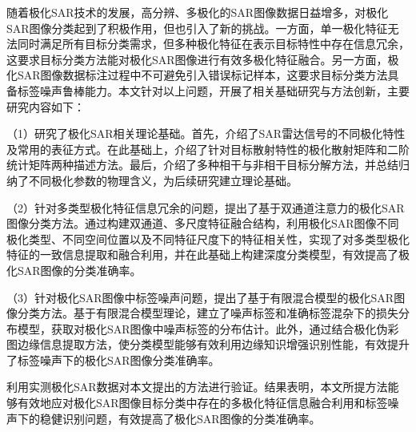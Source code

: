\begin{chineseabstract}


  随着极化SAR技术的发展，高分辨、多极化的SAR图像数据日益增多，对极化SAR图像分类起到了积极作用，但也引入了新的挑战。一方面，单一极化特征无法同时满足所有目标分类需求，但多种极化特征在表示目标特性中存在信息冗余，这要求目标分类方法能对极化SAR图像进行有效多极化特征融合。另一方面，极化SAR图像数据标注过程中不可避免引入错误标记样本，这要求目标分类方法具备标签噪声鲁棒能力。本文针对以上问题，开展了相关基础研究与方法创新，主要研究内容如下：

  （1）研究了极化SAR相关理论基础。首先，介绍了SAR雷达信号的不同极化特性及常用的表征方式。在此基础上，介绍了针对目标散射特性的极化散射矩阵和二阶统计矩阵两种描述方法。最后，介绍了多种相干与非相干目标分解方法，并总结归纳了不同极化参数的物理含义，为后续研究建立理论基础。

  （2）针对多类型极化特征信息冗余的问题，提出了基于双通道注意力的极化SAR图像分类方法。通过构建双通道、多尺度特征融合结构，利用极化SAR图像不同极化类型、不同空间位置以及不同特征尺度下的特征相关性，实现了对多类型极化特征的一致信息提取和融合利用，并在此基础上构建深度分类模型，有效提高了极化SAR图像的分类准确率。

  （3）针对极化SAR图像中标签噪声问题，提出了基于有限混合模型的极化SAR图像分类方法。基于有限混合模型理论，建立了噪声标签和准确标签混杂下的损失分布模型，获取对极化SAR图像中噪声标签的分布估计。此外，通过结合极化伪彩图边缘信息提取方法，使分类模型能够有效利用边缘知识增强识别性能，有效提升了标签噪声下的极化SAR图像分类准确率。

  利用实测极化SAR数据对本文提出的方法进行验证。结果表明，本文所提方法能够有效地应对极化SAR图像目标分类中存在的多极化特征信息融合利用和标签噪声下的稳健识别问题，有效提高了极化SAR图像的分类准确率。


\end{chineseabstract}
